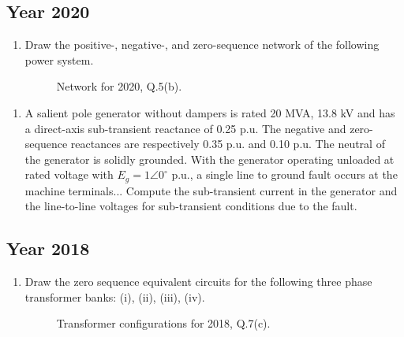 \documentclass[12pt, a4paper]{article}
\begin{document}
	\subsection{Year 2020}
	\begin{enumerate}[label=\textbf{Q5(b).}, wide, labelindent=0pt]
		\item Draw the positive-, negative-, and zero-sequence network of the following power system.
		\begin{figure}[h!]
			\centering
			\caption{Network for 2020, Q.5(b).}
		\end{figure}
	\end{enumerate}
	\begin{enumerate}[label=\textbf{Q6(c).}, wide, labelindent=0pt]
		\item A salient pole generator without dampers is rated 20 MVA, 13.8 kV and has a direct-axis sub-transient reactance of 0.25 p.u. The negative and zero-sequence reactances are respectively 0.35 p.u. and 0.10 p.u. The neutral of the generator is solidly grounded. With the generator operating unloaded at rated voltage with $E_g = 1\angle 0^\circ$ p.u., a single line to ground fault occurs at the machine terminals... Compute the sub-transient current in the generator and the line-to-line voltages for sub-transient conditions due to the fault.
	\end{enumerate}
	
	
	\subsection{Year 2018}
	\begin{enumerate}[label=\textbf{Q7(c).}, wide, labelindent=0pt]
		\item Draw the zero sequence equivalent circuits for the following three phase transformer banks: (i), (ii), (iii), (iv).
		\begin{figure}[h!]
			\centering
			\caption{Transformer configurations for 2018, Q.7(c).}
		\end{figure}
	\end{enumerate}
	
\end{document}
